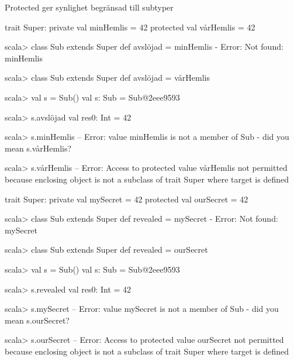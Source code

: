 \begin{Slide}{Protected ger synlighet begränsad till subtyper}
\ifswedish
\begin{Code}[basicstyle=\SlideFontSize{6.2}{7.5}\ttfamily\selectfont]
trait Super:
  private val minHemlis = 42
  protected val vårHemlis = 42
\end{Code}

\begin{REPLsmall}
scala> class Sub extends Super { def avslöjad = minHemlis }
- Error: Not found: minHemlis

scala> class Sub extends Super { def avslöjad = vårHemlis }

scala> val s = Sub()
val s: Sub = Sub@2eee9593

scala> s.avslöjad
val res0: Int = 42

scala> s.minHemlis
-- Error: 
  value minHemlis is not a member of Sub - did you mean s.vårHemlis?

scala> s.vårHemlis
-- Error: 
  Access to protected value vårHemlis not permitted because enclosing object
  is not a subclass of trait Super where target is defined
\end{REPLsmall}
\else
\begin{Code}[basicstyle=\SlideFontSize{6.2}{7.5}\ttfamily\selectfont]
trait Super:
  private val mySecret = 42
  protected val ourSecret = 42
\end{Code}

\begin{REPLsmall}
scala> class Sub extends Super { def revealed = mySecret }
- Error: Not found: mySecret

scala> class Sub extends Super { def revealed = ourSecret }

scala> val s = Sub()
val s: Sub = Sub@2eee9593

scala> s.revealed
val res0: Int = 42

scala> s.mySecret
-- Error: 
  value mySecret is not a member of Sub - did you mean s.ourSecret?

scala> s.ourSecret
-- Error: 
  Access to protected value ourSecret not permitted because enclosing object
  is not a subclass of trait Super where target is defined
\end{REPLsmall}
\fi{}
\end{Slide}


